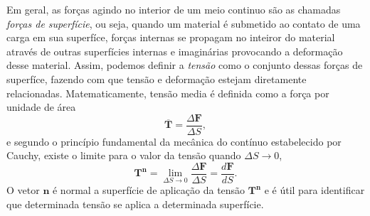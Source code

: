 Em geral, as for\c{c}as agindo no interior de um meio continuo s\~ao as chamadas \textit{for\c{c}as de superf\'icie}, ou seja, quando um material \'e submetido ao contato de uma carga em sua superf\'ice, for\c{c}as internas se propagam no inteiror do material atrav\'es de outras superf\'icies internas e imagin\'arias provocando a deforma\c{c}\~ao desse material. Assim, podemos definir a \textit{tens\~ao} como o conjunto dessas for\c{c}as de superf\'ice, fazendo com que tens\~ao e deforma\c{c}\~ao estejam diretamente relacionadas. Matematicamente, tens\~ao media \'e definida como a for\c{c}a por unidade de \'area
\begin{equation}\label{eq.tensao_media}
\mathbf{\overline{T}}=\frac{\Delta\mathbf{F}}{\Delta S},
\end{equation}
e segundo o princ\'ipio fundamental da mec\^anica do cont\'inuo estabelecido por Cauchy, existe o limite para o valor da tens\~ao quando $\Delta S\to 0$,
\begin{equation*}
\mathbf{T}^{\mathbf{n}}=\lim_{\Delta S\to 0}\frac{\Delta\mathbf{F}}{\Delta S}=\frac{d\mathbf{F}}{dS}.
\end{equation*}
O vetor $\mathbf{n}$ \'e normal a superf\'icie de aplica\c{c}\~ao da tens\~ao $\mathbf{T}^{\mathbf{n}}$ e \'e \'util para identificar que determinada tens\~ao se aplica a determinada superf\'icie.

